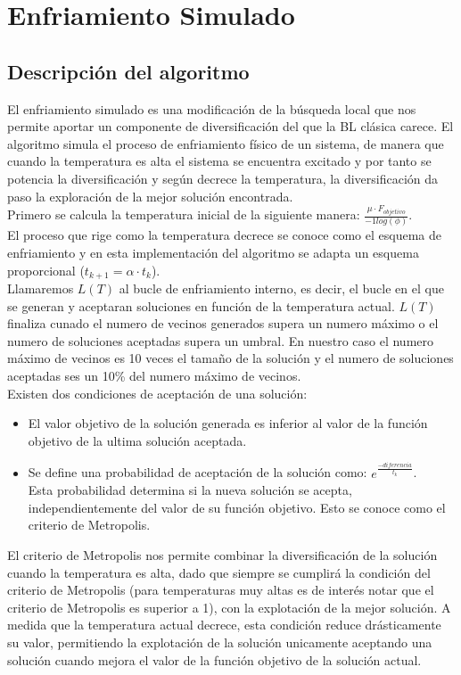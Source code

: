 \newpage
\section{Enfriamiento Simulado}
\subsection{Descripción del algoritmo}
El enfriamiento simulado es una modificación de la búsqueda local que nos permite aportar un componente de diversificación del que la BL clásica carece. El algoritmo simula el proceso de enfriamiento físico de un sistema, de manera que cuando la temperatura es alta el sistema se encuentra excitado y por tanto se potencia la diversificación y según decrece la temperatura, la diversificación da paso la exploración de la mejor solución encontrada. \\
Primero se calcula la temperatura inicial de la siguiente manera: $ \frac{\mu \cdot F_{objetivo}}{-1log(\phi)} $. \\
El proceso que rige como la temperatura decrece se conoce como el esquema de enfriamiento y en esta implementación del algoritmo se adapta un esquema proporcional ($t_{k+1} = \alpha \cdot t_{k}$).\\
Llamaremos $L(T)$ al bucle de enfriamiento interno, es decir, el bucle en el que se generan y aceptaran soluciones en función de la temperatura actual. $L(T)$ finaliza cunado el numero de vecinos generados supera un numero máximo o el numero de soluciones aceptadas supera un umbral.
En nuestro caso el numero máximo de vecinos es 10 veces el tamaño de la solución y el numero de soluciones aceptadas ses un 10\% del numero máximo de vecinos.\\
Existen dos condiciones de aceptación de una solución:
\begin{itemize}
   \item El valor objetivo de la solución generada es inferior al valor de la función objetivo de la ultima solución aceptada.
   \item Se define una probabilidad de aceptación de la solución como: $e^{\frac{-diferencia}{t_{k}}}$.\\
   Esta probabilidad determina si la nueva solución se acepta, independientemente del valor de su función objetivo. Esto se conoce como el criterio de Metropolis.
\end{itemize}
El criterio de Metropolis nos permite combinar la diversificación de la solución cuando la temperatura es alta, dado que siempre se cumplirá la condición del criterio de Metropolis (para temperaturas muy altas es de interés notar que el criterio de Metropolis es superior a 1), con la explotación de la mejor solución. A medida que la temperatura actual decrece, esta condición reduce drásticamente su valor, permitiendo la explotación de la solución unicamente aceptando una solución cuando mejora el valor de la función objetivo de la solución actual.
